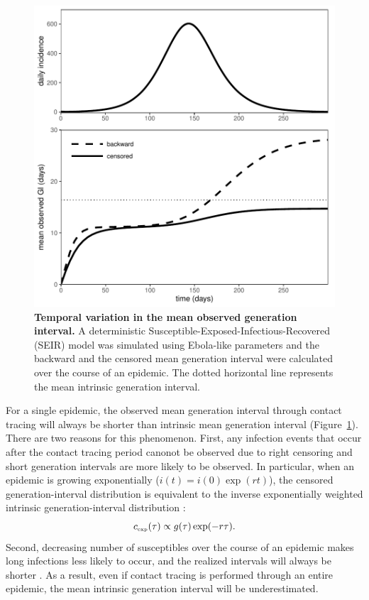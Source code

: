 \documentclass[12pt]{article}
\newcommand{\tsub}[2]{#1_{{\textrm{\tiny #2}}}}
\begin{document}
\begin{figure}[!pbth]
\includegraphics[width=\textwidth]{../fig/temporal_effect.pdf}
\caption{\textbf{Temporal variation in the mean observed generation interval.}
A deterministic Susceptible-Exposed-Infectious-Recovered (SEIR) model was simulated using Ebola-like parameters and the backward and the censored mean generation interval were calculated over the course of an epidemic.
The dotted horizontal line represents the mean intrinsic generation interval.
}
\label{fig:censor}
\end{figure}

For a single epidemic, the observed mean generation interval through contact tracing will always be shorter than intrinsic mean generation interval (Figure~\ref{fig:censor}).
There are two reasons for this phenomenon.
First, any infection events that occur after the contact tracing period canonot be observed due to right censoring and short generation intervals are more likely to be observed.
In particular, when an epidemic is growing exponentially ($i(t) = i(0) \exp(rt)$), 
the censored generation-interval distribution is equivalent to the inverse exponentially weighted intrinsic generation-interval distribution \citep{britton2019estimation}:
\begin{equation}
\tsub{c}{exp}(\tau) \propto g(\tau) \exp(-r\tau).
\label{eq:exp}
\end{equation}
Second, decreasing number of susceptibles over the course of an epidemic makes long infections less likely to occur, and the realized intervals will always be shorter \citep{champredon2015intrinsic}.
As a result, even if contact tracing is performed through an entire epidemic, the mean intrinsic generation interval will be underestimated.
\end{document}
